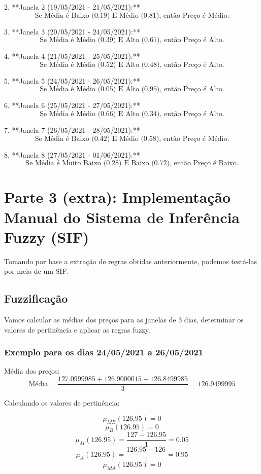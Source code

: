 \documentclass[a4paper, 12pt]{article}
\begin{document}
2. **Janela 2 (19/05/2021 - 21/05/2021):**
   \[
   \text{Se Média é Baixo (0.19) E Médio (0.81), então Preço é Médio.}
   \]

3. **Janela 3 (20/05/2021 - 24/05/2021):**
   \[
   \text{Se Média é Médio (0.39) E Alto (0.61), então Preço é Alto.}
   \]

4. **Janela 4 (21/05/2021 - 25/05/2021):**
   \[
   \text{Se Média é Médio (0.52) E Alto (0.48), então Preço é Alto.}
   \]

5. **Janela 5 (24/05/2021 - 26/05/2021):**
   \[
   \text{Se Média é Médio (0.05) E Alto (0.95), então Preço é Alto.}
   \]

6. **Janela 6 (25/05/2021 - 27/05/2021):**
   \[
   \text{Se Média é Médio (0.66) E Alto (0.34), então Preço é Alto.}
   \]

7. **Janela 7 (26/05/2021 - 28/05/2021):**
   \[
   \text{Se Média é Baixo (0.42) E Médio (0.58), então Preço é Médio.}
   \]

8. **Janela 8 (27/05/2021 - 01/06/2021):**
   \[
   \text{Se Média é Muito Baixo (0.28) E Baixo (0.72), então Preço é Baixo.}
   \]

\newpage
\section{Parte 3 (extra): Implementação Manual do Sistema de Inferência Fuzzy (SIF) }

Tomando por base a extração de regras obtidas anteriormente, podemos testá-las por meio de um SIF.

\subsection{Fuzzificação}

Vamos calcular as médias dos preços para as janelas de 3 dias, determinar os valores de pertinência e aplicar as regras fuzzy.

\subsubsection{Exemplo para os dias 24/05/2021 a 26/05/2021}

Média dos preços:
\[
\text{Média} = \frac{127.0999985 + 126.9000015 + 126.8499985}{3} = 126.9499995
\]

Calculando os valores de pertinência:

\[
\mu_{MB}(126.95) = 0
\]
\[
\mu_{B}(126.95) = 0
\]
\[
\mu_{M}(126.95) = \frac{127 - 126.95}{1} = 0.05
\]
\[
\mu_{A}(126.95) = \frac{126.95 - 126}{1} = 0.95
\]
\[
\mu_{MA}(126.95) = 0
\]
\end{document}
